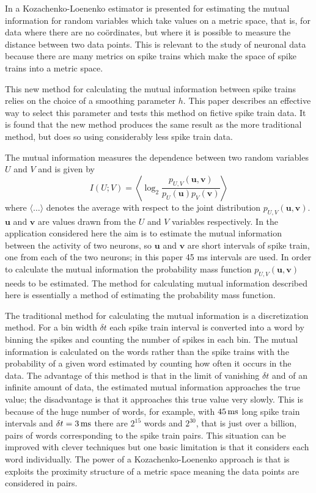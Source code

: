\documentclass[12pt]{article}
\newcommand{\ms}{\mbox{\,ms}}
\renewcommand{\u}{\mathbf{u}}
\renewcommand{\v}{\mathbf{v}}
\begin{document}
In \citet{Houghton2015} a Kozachenko-Loenenko estimator
\citep{KozachenkoLeonenko1987,Victor2002,KraskovEtAl2004} is presented
for estimating the mutual information for random variables which take
values on a metric space, that is, for data where there are no
co\"{o}rdinates, but where it is possible to measure the distance
between two data points. This is relevant to the study of neuronal
data because there are many metrics on spike trains
\citep{VictorPurpura1996,vanRossum2001,AronovEtAl2003,HoughtonSen2008,HoughtonVictor2010}
which make the space of spike trains into a metric space.

This new method for calculating the mutual information between spike
trains relies on the choice of a smoothing parameter $h$. This paper
describes an effective way to select this parameter and tests this
method on fictive spike train data. It is found that the new method
produces the same result as the more traditional method, but does so
using considerably less spike train data.

The mutual information measures the dependence between two random
variables $U$ and $V$ and is given by
\begin{equation}
I(U;V)=\left\langle \log_2{\frac{p_{U,V}(\u,\v)}{p_U(\u)p_V(\v)}}\right\rangle
\end{equation}
where $\langle\ldots\rangle$ denotes the average with respect to the
joint distribution $p_{U,V}(\u,\v)$. $\u$ and $\v$ are values drawn
from the $U$ and $V$ variables respectively.  In the application
considered here the aim is to estimate the mutual information between
the activity of two neurons, so $\u$ and $\v$ are short intervals of
spike train, one from each of the two neurons; in this paper 45 ms
intervals are used. In order to calculate the mutual information the
probability mass function $p_{U,V}(\u,\v)$ needs to be estimated. The
method for calculating mutual information described here is
essentially a method of estimating the probability mass function.

The traditional method for calculating the mutual information is a
discretization method. For a bin width $\delta t$ each spike train
interval is converted into a word by binning the spikes and counting
the number of spikes in each bin. The mutual information is calculated
on the words rather than the spike trains with the probability of a
given word estimated by counting how often it occurs in the data. The
advantage of this method is that in the limit of vanishing $\delta t$
and of an infinite amount of data, the estimated mutual information
approaches the true value; the disadvantage is that it approaches this
true value very slowly. This is because of the huge number of words,
for example, with $45\ms$ long spike train intervals and $\delta
t=3\ms$ there are $2^{15}$ words and $2^{30}$, that is just over a
billion, pairs of words corresponding to the spike train pairs. This
situation can be improved with clever techniques
\citep{NemenmanEtAl2004,TrevesPanzeri1995} but one basic limitation is
that it considers each word individually. The power of a
Kozachenko-Loenenko approach is that is exploits the proximity
structure of a metric space meaning the data points are considered in
pairs.
\end{document}
